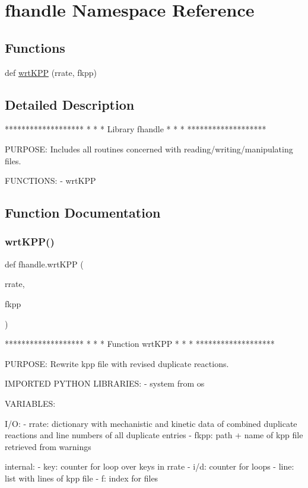 \hypertarget{namespacefhandle}{}\section{fhandle Namespace Reference}
\label{namespacefhandle}
\subsection*{Functions}
\begin{DoxyCompactItemize}
\item 
def \mbox{\hyperlink{namespacefhandle_a360835d7e26fd2d516934a8265dc0ea1}{wrt\+K\+PP}} (rrate, fkpp)
\end{DoxyCompactItemize}


\subsection{Detailed Description}
\begin{DoxyVerb}*******************
*                 *
* Library fhandle *
*                 *
*******************

PURPOSE:
Includes all routines concerned with reading/writing/manipulating files.

FUNCTIONS:
- wrtKPP
\end{DoxyVerb}
 

\subsection{Function Documentation}
\mbox{\label{namespacefhandle_a360835d7e26fd2d516934a8265dc0ea1}} 
\subsubsection{\texorpdfstring{wrt\+K\+P\+P()}{wrtKPP()}}
{\footnotesize\ttfamily def fhandle.\+wrt\+K\+PP (\begin{DoxyParamCaption}\item[{}]{rrate,  }\item[{}]{fkpp }\end{DoxyParamCaption})}

\begin{DoxyVerb}*******************
*                 *
* Function wrtKPP *
*                 *
*******************

PURPOSE:
    Rewrite kpp file with revised duplicate reactions.

IMPORTED PYTHON LIBRARIES:
    - system from os

VARIABLES:

I/O:
    - rrate:    dictionary with mechanistic and kinetic data of
                combined duplicate reactions and line numbers of
                all duplicate entries
    - fkpp:     path + name of kpp file retrieved from warnings

internal:
    - key:      counter for loop over keys in rrate
    - i/d:      counter for loops
    - line:     list with lines of kpp file
    - f:        index for files
\end{DoxyVerb}
 
